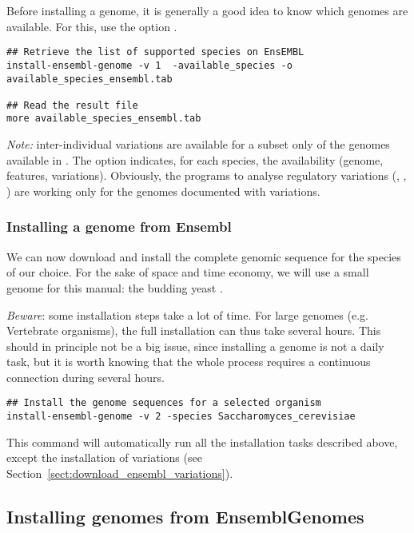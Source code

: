 Before installing a genome, it is generally a good idea to know which
genomes are available. For this, use the option
.

\begin{lstlisting}
## Retrieve the list of supported species on EnsEMBL
install-ensembl-genome -v 1  -available_species -o available_species_ensembl.tab

## Read the result file
more available_species_ensembl.tab
\end{lstlisting}

\emph{Note:} inter-individual variations are available for a subset
only of the genomes available in \ensembl. The option
 indicates, for each species, the
availability (genome, features, variations). Obviously, the programs
to analyse regulatory variations (,
, ) are
working only for the genomes documented with variations.

\subsubsection{Installing a genome from Ensembl}

We can now download and install the complete genomic sequence for the
species of our choice. For the sake of space and time economy, we will
use a small genome for this manual: the budding yeast
.

\emph{Beware}: some installation steps take a lot of time. For large
genomes (e.g. Vertebrate organisms), the full installation can thus
take several hours. This should in principle not be a big issue, since
installing a genome is not a daily task, but it is worth knowing that
the whole process requires a continuous connection during several
hours.

\begin{lstlisting}
## Install the genome sequences for a selected organism
install-ensembl-genome -v 2 -species Saccharomyces_cerevisiae
\end{lstlisting}

This command will automatically run all the installation tasks
described above, except the installation of variations (see
Section~\ref{sect:download_ensembl_variations}).

\subsection{Installing genomes from EnsemblGenomes}

